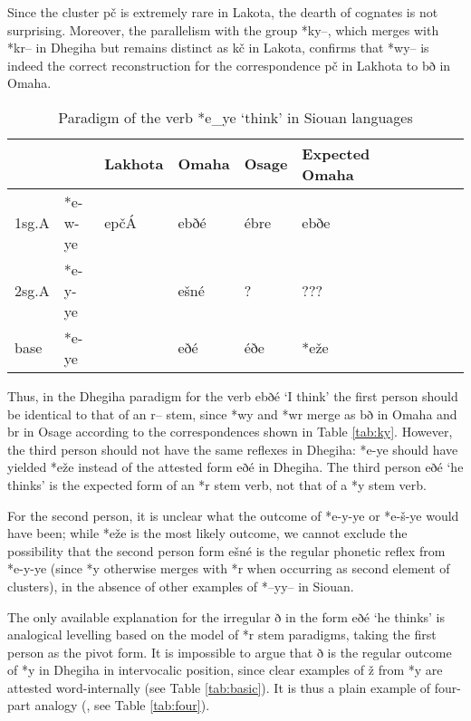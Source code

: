 \documentclass[oneside,a4paper,11pt]{article}
\newcommand{\ipa}[1]{{\phon#1}} %
\newcommand{\grise}[1]{\cellcolor{lightgray}\textbf{#1}}
\begin{document}
  
 
 Since the cluster \ipa{pč} is extremely rare in Lakota, the dearth of cognates is not surprising. Moreover, the parallelism with the group *\ipa{ky--}, which merges with *\ipa{kr--} in Dhegiha but remains distinct as \ipa{kč} in Lakota, confirms that *\ipa{wy--} is indeed the correct reconstruction for the correspondence \ipa{pč} in Lakhota to \ipa{bð} in Omaha.
 
 \begin{table}[h]
\caption{Paradigm of the verb *\ipa{e\_ye} `think' in Siouan languages}  \label{tab:think} \centering
\begin{tabular}{ll|l|ll|llll|ll}
\toprule
 &	 &	Lakhota &	 	Omaha &	Osage 	& Expected Omaha\\	
 \midrule
1sg.A &	*\ipa{e-w-ye} &	 \ipa{epčÁ} &   \ipa{ebðé} &\ipa{ébre} &\ipa{ebðe}\\
2sg.A &*\ipa{e-y-ye}&  &  \ipa{ešné} &? &???& \\
base &	*\ipa{e-ye} &	  &\ipa{eðé} &\ipa{éðe} & *\ipa{eže}\grise{}\\
\bottomrule			
\end{tabular}
\end{table} 

 Thus, in the Dhegiha paradigm for the verb \ipa{ebðé} `I think'     the first person should  be identical to that of an \ipa{r--} stem, since *\ipa{wy} and *\ipa{wr} merge as \ipa{bð} in Omaha and \ipa{br} in Osage according to the correspondences shown in Table \ref{tab:ky}. However,  the third person should not have the same reflexes in Dhegiha:  *\ipa{e-ye} should have yielded *\ipa{eže} instead of the attested form \ipa{eðé} in Dhegiha. The third person \ipa{eðé}  `he thinks' is the expected  form of an *\ipa{r} stem verb, not that of a *\ipa{y} stem verb.
 
 
 For the second person, it is unclear what the outcome of *\ipa{e-y-ye} or *\ipa{e-š-ye} would have been; while  *\ipa{eže}  is the most likely outcome, we cannot exclude the possibility that the second person form  \ipa{ešné} is the regular phonetic reflex from  *\ipa{e-y-ye} (since *\ipa{y} otherwise merges with *\ipa{r} when occurring as second element of clusters), in the absence of other examples of *\ipa{--yy--} in Siouan.

The only available explanation for the irregular \ipa{ð} in the form \ipa{eðé} `he thinks' is analogical levelling based on the model of *\ipa{r} stem paradigms, taking the first person as the pivot form. It is impossible to argue that \ipa{ð} is the regular outcome of *\ipa{y} in Dhegiha in intervocalic position, since clear examples of \ipa{ž} from *\ipa{y} are attested word-internally (see Table \ref{tab:basic}). It is thus a plain example of four-part analogy (\citealt[167-175]{hock91principles}, see Table \ref{tab:four}).
\end{document}

